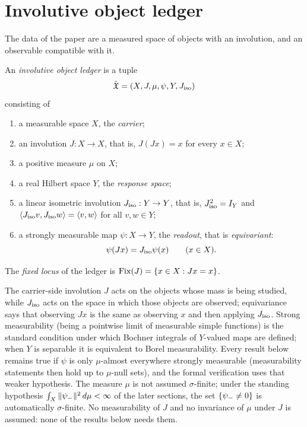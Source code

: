 \section{Involutive object ledger}
\label{sec:involutive_ledger}

The data of the paper are a measured space of objects with an
involution, and an observable compatible with it.

\begin{definition}
\label{def:duality_confinement:involutive-object-ledger}
An \emph{involutive object ledger} is a tuple
\[
  \hat{\mathfrak{X}}=(X,J,\mu,\psi,Y,J_{\mathrm{iso}})
\]
consisting of
\begin{enumerate}
  \item a measurable space \(X\), the \emph{carrier};
  \item an involution \(J:X\to X\), that is, \(J(Jx)=x\) for every
    \(x\in X\);
  \item a positive measure \(\mu\) on \(X\);
  \item a real Hilbert space \(Y\), the \emph{response space};
  \item a linear isometric involution \(J_{\mathrm{iso}}:Y\to Y\), that is,
    \(J_{\mathrm{iso}}^2=I_Y\) and
    \(\langle J_{\mathrm{iso}} v,J_{\mathrm{iso}} w\rangle=\langle v,w\rangle\) for all
    \(v,w\in Y\);
  \item a strongly measurable map \(\psi:X\to Y\), the
    \emph{readout}, that is \emph{equivariant}:
    \[
      \psi(Jx)=J_{\mathrm{iso}}\psi(x)
      \qquad (x\in X).
    \]
\end{enumerate}
The \emph{fixed locus} of the ledger is
\(\operatorname{Fix}(J)=\{x\in X: Jx=x\}\).
\end{definition}

The carrier-side involution \(J\) acts on the objects whose mass is
being studied, while \(J_{\mathrm{iso}}\) acts on the space in which those objects
are observed; equivariance says that observing \(Jx\) is the same as
observing \(x\) and then applying \(J_{\mathrm{iso}}\).  Strong measurability
(being a pointwise limit of measurable simple functions) is the
standard condition under which Bochner integrals of \(Y\)-valued maps
are defined; when \(Y\) is separable it is equivalent to Borel
measurability.  Every result below remains true if \(\psi\) is only
\(\mu\)-almost everywhere strongly measurable (measurability statements
then hold up to \(\mu\)-null sets), and the formal verification uses
that weaker hypothesis.  The measure \(\mu\) is not assumed
\(\sigma\)-finite; under the standing hypothesis
\(\int_X\|\psi_{-}\|^2\,d\mu<\infty\) of the later sections, the set
\(\{\psi_{-}\neq0\}\) is automatically \(\sigma\)-finite.  No measurability of \(J\) and no invariance of \(\mu\)
under \(J\) is assumed: none of the results below needs them.

